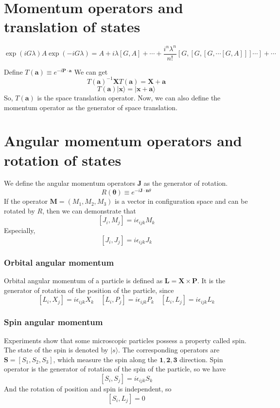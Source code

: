 \documentclass[cyan]{elegantnote}
\begin{document}
\section{Momentum operators and translation of states}
\begin{newthem}
\[\exp(iG\lambda) A \exp(-iG\lambda) = A + i\lambda[G,A] + \cdots + \frac{i^n\lambda^n}{n!}[G,[G,[G,\cdots[G,A]]]\cdots]+\cdots\]
\end{newthem}
\noindent
Define $T(\bm{a}) \equiv e^{-i\bm{P \cdot a}}$
We can get
\[T(\bm{a})^{-1} \bm{X} T(\bm{a}) = \bm{X} + \bm{a}\]
\[T(\bm{a})|\bm{x}\rangle = |\bm{x}+\bm{a}\rangle\]
So, $T(\bm{a})$ is the space translation operator. 
Now, we can also define the momentum operator as the generator of space translation.

\section{Angular momentum operators and rotation of states}
\noindent
We define the angular momentum operators $\bm{J}$ as the generator of rotation.
\[R(\bm{\theta}) \equiv e^{-i\bm{J} \cdot \bm{n} \theta}\]
If the operator $\bm{M} = (M_1,M_2,M_3)$ is a vector in configuration space and can be rotated by $R$, then we can demonstrate that
\[[J_{i},M_{j}] = i \epsilon_{ijk}M_k\]
Especially, 
\[[J_i,J_j] = i\epsilon_{ijk}J_k\]

\subsubsection{Orbital angular momentum}
\noindent
Orbital angular momentum of a particle is defined as $\bm{L} = \bm{X} \times \bm{P}$. It is the generator of rotation of the position of the particle, since
\[[L_i,X_j] = i\epsilon_{ijk}X_k \quad [L_i,P_j] = i\epsilon_{ijk}P_k \quad [L_i,L_j] = i\epsilon_{ijk}L_k\]

\subsubsection{Spin angular momentum}
\noindent
Experiments show that some microscopic particles possess a property called spin. The state of the spin is denoted by $|s\rangle$. The corresponding operators are $\bm{S} = [S_1,S_2,S_3]$, which measure the spin along the $\bm{1},\bm{2},\bm{3}$ direction. Spin operator is the generator of rotation of the spin of the particle, so we have
\[[S_i,S_j]=i\epsilon_{ijk}S_k\]
And the rotation of position and spin is independent, so
\[[S_i,L_j] = 0\]
\end{document}
